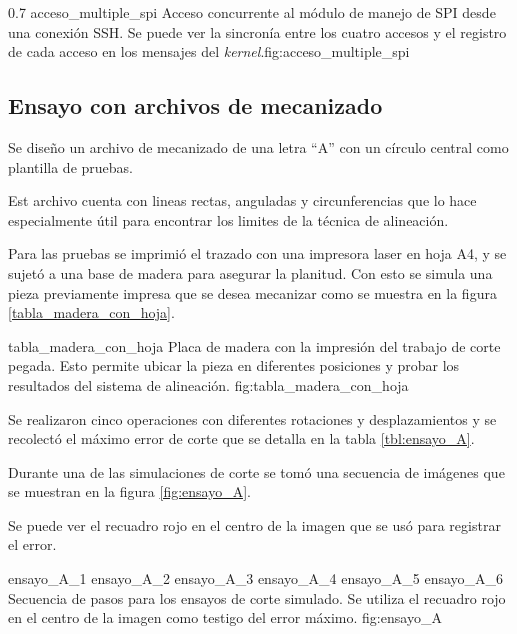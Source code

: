 \subfiga
{0.7} {acceso_multiple_spi} {Acceso concurrente al módulo de manejo de SPI desde una conexión SSH. Se puede ver la sincronía entre los cuatro accesos y el registro de cada acceso en los mensajes del \textit{kernel}.}{fig:acceso_multiple_spi}


\subsection{Ensayo con archivos de mecanizado}

Se diseño un archivo de mecanizado de una letra ``A'' con un círculo central como plantilla de pruebas.\par
Est archivo cuenta con lineas rectas, anguladas y circunferencias que lo hace especialmente útil para encontrar los limites de la técnica de alineación. \par
Para las pruebas se imprimió el trazado con una impresora laser en hoja A4, y se sujetó a una base de madera para asegurar la planitud. Con esto se simula una pieza previamente impresa que se desea mecanizar como se muestra en la figura \ref{tabla_madera_con_hoja}.\par

    {tabla_madera_con_hoja} {Placa de madera con la impresión del trabajo de corte pegada. Esto permite ubicar la pieza en diferentes posiciones y probar los resultados del sistema de alineación.} {fig:tabla_madera_con_hoja}

   Se realizaron cinco operaciones con diferentes rotaciones y desplazamientos y se recolectó el máximo error de corte que se detalla en la tabla \ref{tbl:ensayo_A}.\par
   Durante una de las simulaciones de corte se tomó una secuencia de imágenes que se muestran en la figura \ref{fig:ensayo_A}.\par
   Se puede ver el recuadro rojo en el centro de la imagen que se usó para registrar el error.\par

   \subfigthreethree
      {ensayo_A_1}
      {ensayo_A_2}
      {ensayo_A_3}
      {ensayo_A_4}
      {ensayo_A_5}
      {ensayo_A_6}
      {Secuencia de pasos para los ensayos de corte simulado. Se utiliza el recuadro rojo en el centro de la imagen como testigo del error máximo.}
      {fig:ensayo_A}

